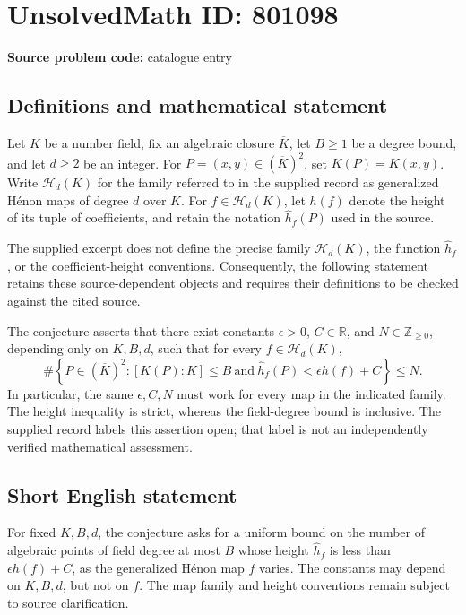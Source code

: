 \documentclass[11pt]{article}
\newcommand{\Z}{\mathbb{Z}}
\newcommand{\R}{\mathbb{R}}
\begin{document}
\section*{UnsolvedMath ID: 801098}
\textbf{Source problem code:} catalogue entry
\subsection{Definitions and mathematical statement}
Let \(K\) be a number field, fix an algebraic closure \(\overline K\), let \(B\geq 1\) be a degree bound, and let \(d\geq 2\) be an integer. For \(P=(x,y)\in(\overline K)^2\), set \(K(P)=K(x,y)\). Write \(\mathcal H_d(K)\) for the family referred to in the supplied record as generalized H\'{e}non maps of degree \(d\) over \(K\). For \(f\in\mathcal H_d(K)\), let \(h(f)\) denote the height of its tuple of coefficients, and retain the notation \(\hat h_f(P)\) used in the source.

The supplied excerpt does not define the precise family \(\mathcal H_d(K)\), the function \(\hat h_f\), or the coefficient-height conventions. Consequently, the following statement retains these source-dependent objects and requires their definitions to be checked against the cited source.

The conjecture asserts that there exist constants \(\epsilon>0\), \(C\in\R\), and \(N\in\Z_{\geq 0}\), depending only on \(K,B,d\), such that for every \(f\in\mathcal H_d(K)\),
\[
\#\left\{P\in(\overline K)^2:
[K(P):K]\leq B\ \text{and}\
\hat h_f(P)<\epsilon h(f)+C
\right\}\leq N.
\]
In particular, the same \(\epsilon,C,N\) must work for every map in the indicated family. The height inequality is strict, whereas the field-degree bound is inclusive. The supplied record labels this assertion open; that label is not an independently verified mathematical assessment.
\subsection{Short English statement}
For fixed \(K,B,d\), the conjecture asks for a uniform bound on the number of algebraic points of field degree at most \(B\) whose height \(\hat h_f\) is less than \(\epsilon h(f)+C\), as the generalized H\'{e}non map \(f\) varies. The constants may depend on \(K,B,d\), but not on \(f\). The map family and height conventions remain subject to source clarification.
\end{document}
